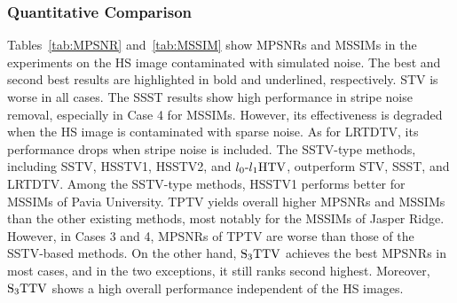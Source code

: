 \documentclass[10pt,journal]{IEEEtran}
\begin{document}
% 
% 
% 
\setcounter{subsubsection}{0}
\subsubsection{Quantitative Comparison}
\label{subsubsec:QuantitativeComparison}
Tables~\ref{tab:MPSNR} and~\ref{tab:MSSIM} show MPSNRs and MSSIMs in the experiments on the HS image contaminated with simulated noise.
The best and second best results are highlighted in bold and underlined, respectively.
STV is worse in all cases.
The SSST results show high performance in stripe noise removal, especially in Case 4 for MSSIMs.
However, its effectiveness is degraded when the HS image is contaminated with sparse noise.
As for LRTDTV, its performance drops when stripe noise is included.
The SSTV-type methods, including SSTV, HSSTV1, HSSTV2, and ${l_{0}\text{-}l_{1}\text{HTV}}$, outperform STV, SSST, and LRTDTV.
Among the SSTV-type methods, HSSTV1 performs better for MSSIMs of Pavia University.
TPTV yields overall higher MPSNRs and MSSIMs than the other existing methods, most notably for the MSSIMs of Jasper Ridge.
However, in Cases 3 and 4, MPSNRs of TPTV are worse than those of the SSTV-based methods.
On the other hand, ${\text{S}_{3} \text{TTV}}$ achieves the best MPSNRs in most cases, and in the two exceptions, it still ranks second highest.
Moreover, ${\text{S}_{3} \text{TTV}}$ shows a high overall performance independent of the HS images.
\end{document}

